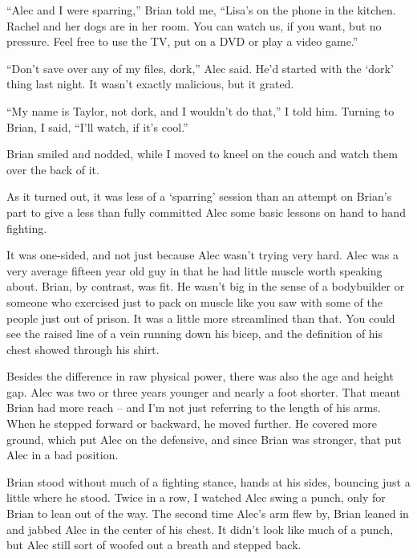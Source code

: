``Alec and I were sparring,'' Brian told me, ``Lisa's on the phone in the kitchen.  Rachel and her dogs are in her room.  You can watch us, if you want, but no pressure.  Feel free to use the TV, put on a DVD or play a video game.''



``Don't save over any of my files, dork,'' Alec said.  He'd started with the `dork' thing last night.  It wasn't exactly malicious, but it grated.



``My name is Taylor, not dork, and I wouldn't do that,'' I told him.  Turning to Brian, I said, ``I'll watch, if it's cool.''



Brian smiled and nodded, while I moved to kneel on the couch and watch them over the back of it.



As it turned out, it was less of a `sparring' session than an attempt on Brian's part to give a less than fully committed Alec some basic lessons on hand to hand fighting.



It was one-sided, and not just because Alec wasn't trying very hard.  Alec was a very average fifteen year old guy in that he had little muscle worth speaking about.  Brian, by contrast, was fit.  He wasn't big in the sense of a bodybuilder or someone who exercised just to pack on muscle like you saw with some of the people just out of prison.  It was a little more streamlined than that.  You could see the raised line of a vein running down his bicep, and the definition of his chest showed through his shirt.



Besides the difference in raw physical power, there was also the age and height gap.  Alec was two or three years younger and nearly a foot shorter.  That meant Brian had more reach – and I'm not just referring to the length of his arms.  When he stepped forward or backward, he moved further.  He covered more ground, which put Alec on the defensive, and since Brian was stronger, that put Alec in a bad position.



Brian stood without much of a fighting stance, hands at his sides, bouncing just a little where he stood.  Twice in a row, I watched Alec swing a punch, only for Brian to lean out of the way.  The second time Alec's arm flew by, Brian leaned in and jabbed Alec in the center of his chest.  It didn't look like much of a punch, but Alec still sort of woofed out a breath and stepped back.



